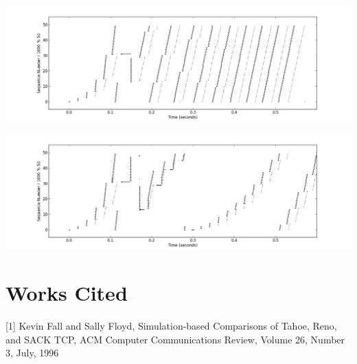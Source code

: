 \documentclass[11pt]{article}
\begin{document}
\centerline{\includegraphics[width=22cm]{AIMD_reno.png}}

\centerline{\includegraphics[width=22cm]{burst_loss_reno.png}}

\section{Works Cited}

[1] Kevin Fall and Sally Floyd, Simulation-based Comparisons of Tahoe, Reno, and SACK TCP, ACM Computer Communications Review, Volume 26, Number 3, July, 1996
\end{document}
